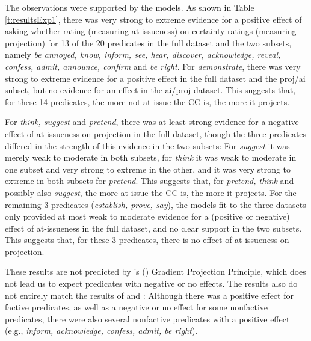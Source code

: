 \documentclass[11pt,fleqn]{article}
\newcommand{\6}{\mbox{$[\hspace*{-.6mm}[$}}
\newcommand{\9}{\mbox{$]\hspace*{-.6mm}]$}}
\newcommand{\citetpos}[1]{\citeauthor{#1}'s (\citeyear{#1})}
\begin{document}
The observations were supported by the models. As shown in Table \ref{t:resultsExp1}, there was very strong to extreme evidence for a positive effect of asking-whether rating (measuring at-issueness) on certainty ratings (measuring projection) for 13 of the 20 predicates in the full dataset and the two subsets, namely {\em be annoyed, know, inform, see, hear, discover, acknowledge, reveal, confess, admit, announce, confirm} and {\em be right}. For {\em demonstrate}, there was very strong to extreme evidence for a positive effect in the full dataset and the proj/ai subset, but no evidence for an effect in the ai/proj dataset. This suggests that, for these 14 predicates, the more not-at-issue the CC is, the more it projects. 

For {\em think, suggest} and {\em pretend}, there was at least strong evidence for a negative effect of at-issueness on projection in the full dataset, though the three predicates differed in the strength of this evidence in the two subsets: For {\em suggest} it was merely weak to moderate in both subsets, for {\em think} it was weak to moderate in one subset and very strong to extreme in the other, and it was very strong to extreme in both subsets for {\em pretend}. This suggests that, for {\em pretend, think} and possibly also {\em suggest}, the more at-issue the CC is, the more it projects. For the remaining 3 predicates ({\em establish, prove, say}), the models fit to the three datasets only provided at most weak to moderate evidence for a (positive or negative) effect of at-issueness in the full dataset, and no clear support in the two subsets. This suggests that, for these 3 predicates, there is no effect of at-issueness on projection.

These results are not predicted by \citetpos{tbd-variability} Gradient Projection Principle, which does not lead us to expect predicates with negative or no effects. The results also do not entirely match the results of \cite{djaerv-bacovcin-salt27,djaerv-bacovcin2020} and  \cite{mahler-etal2020}: Although there was a positive effect for factive predicates, as well as a negative or no effect for some nonfactive predicates, there were also several nonfactive predicates with a positive effect (e.g., {\em inform, acknowledge, confess, admit, be right}). 
\end{document}
